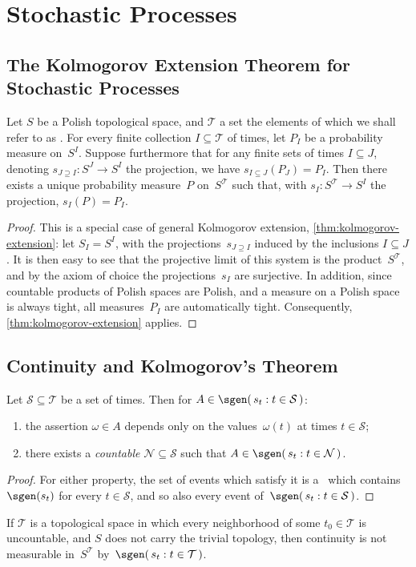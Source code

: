 \section	{Stochastic Processes}

\subsection	{The Kolmogorov Extension Theorem for Stochastic Processes}

\begin	{theorem}
\label	{thm:kolmogorov-extension-for-processes}
Let $S$ be a Polish topological space,
and $\mathcal T$ a set the elements of which we shall refer to as .
For every finite collection \( I \subseteq \mathcal T \) of times,
let \( P_I \) be a probability measure on~$S^I$.
Suppose furthermore that for any finite sets of times \( I \subseteq J \),
denoting \( s_{J \supseteq I} \colon S^J \to S^I \) the projection,
we have \( s_{I \subseteq J}(P_J) = P_I \).
Then there exists a unique probability measure~$P$ on~$S^{\mathcal T}$
such that, with \( s_I \colon S^{\mathcal T} \to S^I \)
the projection, \( s_I(P) = P_I \).
\end	{theorem}
\begin	{proof}
This is a special case of general Kolmogorov extension,
\autoref{thm:kolmogorov-extension}:
let \( S_I = S^I \), with the projections~$s_{J \supseteq I}$
induced by the inclusions \( I \subseteq J \).
It is then easy to see that the projective limit of this system
is the product~$S^{\mathcal T}$,
and by the axiom of choice the projections~$s_I$ are surjective.
In addition, since countable products of Polish spaces are Polish,
and a measure on a Polish space is always tight,
all measures~$P_I$ are automatically tight.
Consequently, \autoref{thm:kolmogorov-extension} applies.
\end	{proof}


\subsection	{Continuity and Kolmogorov's Theorem}

\begin	{proposition}
Let \( \mathcal S \subseteq \mathcal T \) be a set of times.
Then for \( A \in \sgen(\, s_t : t \in \mathcal S \,) \):
\begin	{enumerate}
\item	the assertion \( \omega \in A \) depends only on the values~$\omega(t)$
	at times \( t \in \mathcal S \);
\item	there exists a \emph{countable} \( \mathcal N \subseteq \mathcal S \)
	such that \( A \in \sgen(\, s_t : t \in \mathcal N \,) \).
\end	{enumerate}
\end	{proposition}
\begin	{proof}
For either property, the set of events which satisfy it
is a \salg\ which contains $\sgen(s_t)$ for every \( t \in \mathcal S \),
and so also every event of~\( \sgen(\, s_t : t \in \mathcal S \,) \).
\end	{proof}

\begin	{corollary}
If $\mathcal T$ is a topological space
in which every neighborhood of some \( t_0 \in \mathcal T \) is uncountable,
and $S$ does not carry the trivial topology,
then continuity is not measurable in~$S^{\mathcal T}$
by~\( \sgen(\, s_t : t \in \mathcal T \,) \).
\end	{corollary}
